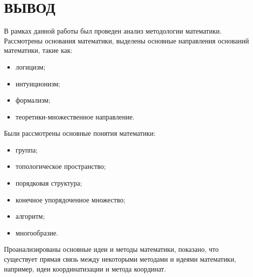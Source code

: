 %





\chapter*{ВЫВОД}

В рамках данной работы был проведен анализ методологии математики. Рассмотрены основания математики, выделены основные направления оснований математики, такие как:

\begin{itemize}
	\item логицизм;
	\item интуиционизм;
	\item формализм;
	\item теоретики-множественное направление.
\end{itemize}

Были рассмотрены основные понятия математики:

\begin{itemize}
	\item группа;
	\item топологическое пространство;
	\item порядковая структура;
	\item конечное упорядоченное множество;
	\item алгоритм;
	\item многообразие.
\end{itemize}

Проанализированы основные идеи и методы математики, показано, что существует прямая связь между некоторыми методами и идеями математики, например, идеи координатизации и метода координат.

